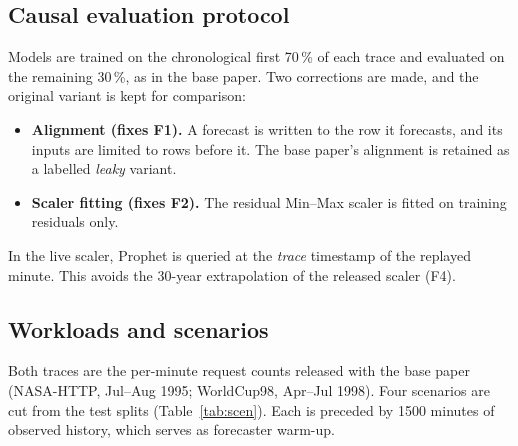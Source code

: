 \documentclass[11pt,a4paper]{article}
\begin{document}
\subsection{Causal evaluation protocol}
Models are trained on the chronological first 70\,\% of each trace and evaluated on the remaining 30\,\%, as in
the base paper. Two corrections are made, and the original variant is kept for comparison:
\begin{itemize}
\item \textbf{Alignment (fixes F1).} A forecast is written to the row it forecasts, and its inputs are limited
      to rows before it. The base paper's alignment is retained as a labelled \emph{leaky} variant.
\item \textbf{Scaler fitting (fixes F2).} The residual Min--Max scaler is fitted on training residuals only.
\end{itemize}
In the live scaler, Prophet is queried at the \emph{trace} timestamp of the replayed minute. This avoids the
30-year extrapolation of the released scaler (F4).

\subsection{Workloads and scenarios}
Both traces are the per-minute request counts released with the base paper (NASA-HTTP, Jul--Aug 1995;
WorldCup98, Apr--Jul 1998). Four scenarios are cut from the test splits (Table~\ref{tab:scen}). Each is
preceded by 1500 minutes of observed history, which serves as forecaster warm-up.

\begin{table}[H]\centering\small

\caption{Workload scenarios (test split only). CV: coefficient of variation; p99 step: 99th percentile of the
absolute minute-to-minute change.}\label{tab:scen}
\end{table}
\end{document}
